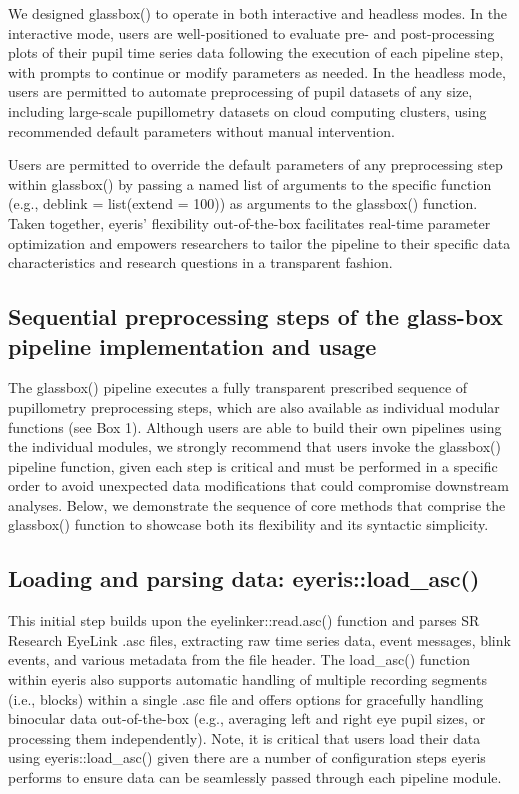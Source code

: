 We designed glassbox() to operate in both interactive and headless modes. In the interactive mode, users are well-positioned to evaluate pre- and post-processing plots of their pupil time series data following the execution of each pipeline step, with prompts to continue or modify parameters as needed. In the headless mode, users are permitted to automate preprocessing of pupil datasets of any size, including large-scale pupillometry datasets on cloud computing clusters, using recommended default parameters without manual intervention.

Users are permitted to override the default parameters of any preprocessing step within glassbox() by passing a named list of arguments to the specific function (e.g., deblink = list(extend = 100)) as arguments to the glassbox() function. Taken together, eyeris’ flexibility out-of-the-box facilitates real-time parameter optimization and empowers researchers to tailor the pipeline to their specific data characteristics and research questions in a transparent fashion.

\subsection{Sequential preprocessing steps of the glass-box pipeline implementation and usage}
The glassbox() pipeline executes a fully transparent prescribed sequence of pupillometry preprocessing steps, which are also available as individual modular functions (see Box 1). Although users are able to build their own pipelines using the individual modules, we strongly recommend that users invoke the glassbox() pipeline function, given each step is critical and must be performed in a specific order to avoid unexpected data modifications that could compromise downstream analyses. Below, we demonstrate the sequence of core methods that comprise the glassbox() function to showcase both its flexibility and its syntactic simplicity.

\subsection{Loading and parsing data: eyeris::load\_asc()}
This initial step builds upon the eyelinker::read.asc() function and parses SR Research EyeLink .asc files, extracting raw time series data, event messages, blink events, and various metadata from the file header. The load\_asc() function within eyeris also supports automatic handling of multiple recording segments (i.e., blocks) within a single .asc file and offers options for gracefully handling binocular data out-of-the-box (e.g., averaging left and right eye pupil sizes, or processing them independently). Note, it is critical that users load their data using eyeris::load\_asc() given there are a number of configuration steps eyeris performs to ensure data can be seamlessly passed through each pipeline module.

